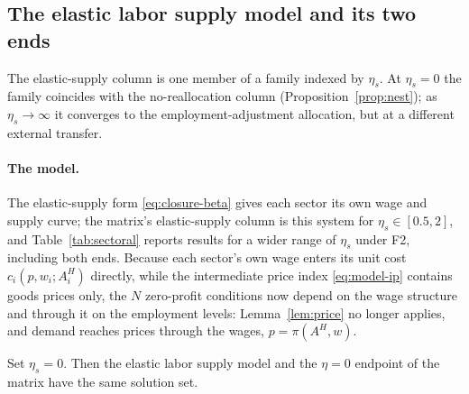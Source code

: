 \subsection{The elastic labor supply model and its two ends}\label{app:sectoral}

The elastic-supply column is one member of a family indexed by $\eta_s$. At $\eta_s=0$ the family coincides with the no-reallocation column (Proposition~\ref{prop:nest}); as $\eta_s\to\infty$ it converges to the employment-adjustment allocation, but at a different external transfer.

\paragraph{The model.} The elastic-supply form \eqref{eq:closure-beta} gives
each sector its own wage and supply curve; the matrix's elastic-supply
column is this system for $\eta_s \in [0.5, 2]$, and
Table~\ref{tab:sectoral} reports results for a wider range of $\eta_s$ under F2, including both ends. Because
each sector's own wage enters its unit cost $c_i(p,w_i;A_i^{H})$ directly, while the
intermediate price index \eqref{eq:model-ip} contains goods prices only, the $N$
zero-profit conditions now depend on the wage structure and through it on the
employment levels: Lemma~\ref{lem:price} no longer applies, and demand reaches
prices through the wages, $p = \pi(A^{H}, w)$.

\begin{proposition}[The rigid corner is the $\eta = 0$ endpoint]\label{prop:nest}
Set $\eta_s = 0$. Then the elastic labor supply model and the $\eta = 0$
endpoint of the matrix have the same solution set.
\end{proposition}

